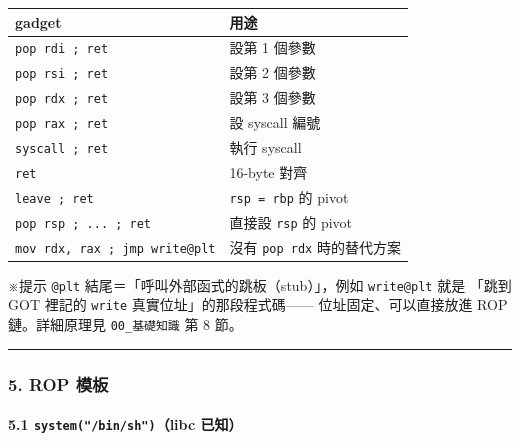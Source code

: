 \documentclass[10pt,a4paper]{article}
\newcounter{none}
\renewenvironment{quote}{%
  \begin{mdframed}[linewidth=0pt,innerleftmargin=0pt,innerrightmargin=0pt,
    innerbottommargin=0pt,innertopmargin=0pt,skipabove=0.55em,skipbelow=0.55em,
    leftmargin=0.9em,rightmargin=0.4em,startcode={\color{quotebar}\vrule width 2.6pt},%
    endcode={}]%
  \itshape\color{black}%
}{%
  \end{mdframed}%
}
\begin{document}
{\def\LTcaptype{none} %
\begin{longtable}[]{@{}ll@{}}
\toprule\noalign{}
gadget & 用途 \\
\midrule\noalign{}
\endhead
\bottomrule\noalign{}
\endlastfoot
\texttt{pop\ \allowbreak{}rdi\ \allowbreak{};\ \allowbreak{}ret} & 設第 1 個參數 \\
\texttt{pop\ \allowbreak{}rsi\ \allowbreak{};\ \allowbreak{}ret} & 設第 2 個參數 \\
\texttt{pop\ \allowbreak{}rdx\ \allowbreak{};\ \allowbreak{}ret} & 設第 3 個參數 \\
\texttt{pop\ \allowbreak{}rax\ \allowbreak{};\ \allowbreak{}ret} & 設 syscall 編號 \\
\texttt{syscall\ \allowbreak{};\ \allowbreak{}ret} & 執行 syscall \\
\texttt{ret} & 16-byte 對齊 \\
\texttt{leave\ \allowbreak{};\ \allowbreak{}ret} & \texttt{rsp\ \allowbreak{}=\ \allowbreak{}rbp} 的 pivot \\
\texttt{pop\ \allowbreak{}rsp\ \allowbreak{};\ \allowbreak{}...\allowbreak{}\ \allowbreak{};\ \allowbreak{}ret} & 直接設 \texttt{rsp} 的 pivot \\
\texttt{mov\ \allowbreak{}rdx,\allowbreak{}\ \allowbreak{}rax\ \allowbreak{};\ \allowbreak{}jmp\ \allowbreak{}write@plt} & 沒有 \texttt{pop\ \allowbreak{}rdx}
時的替代方案 \\
\end{longtable}
}

\begin{quote}
※提示 \texttt{@plt} 結尾＝「呼叫外部函式的跳板（stub）」，例如
\texttt{write@plt} 就是 「跳到 GOT 裡記的 \texttt{write}
真實位址」的那段程式碼------ 位址固定、可以直接放進 ROP 鏈。詳細原理見
\texttt{00\_\allowbreak{}基礎知識} 第 8 節。
\end{quote}

\begin{center}\rule{0.5\linewidth}{0.5pt}\end{center}

\subsubsection{5. ROP 模板}\label{rop-ux6a21ux677f}

\paragraph{\texorpdfstring{5.1 \texttt{system("/\allowbreak{}bin/\allowbreak{}sh")}（libc
已知）}{5.1 system("/bin/sh")（libc 已知）}}\label{systembinshlibc-ux5df2ux77e5}
\end{document}
